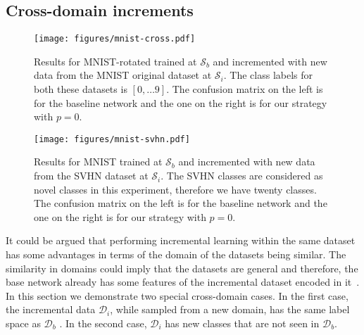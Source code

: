 \documentclass[10pt,twocolumn,letterpaper]{article}
\def \cS{{\mathcal{S}}}
\def \cD{{\mathcal{D}}}
\begin{document}
	
	\subsection{Cross-domain increments}
	
	\begin{figure}[t]
		\begin{center}
			\texttt{[image: figures/mnist-cross.pdf]}
		\end{center}
		
		\caption{Results for MNIST-rotated trained at $\cS_b$ and incremented with new data from the MNIST original dataset at $\cS_i$. The  class labels for both these datasets is $[0, \dots 9]$. The confusion matrix on the left is for the baseline network and the one on the right is for our strategy with $p=0$.}
		
		\label{fig:mnist-cross}
	\end{figure}
	
	\begin{figure}[t]
		\begin{center}
			\texttt{[image: figures/mnist-svhn.pdf]}
		\end{center}
		
		\caption{Results for MNIST trained at $\cS_b$ and incremented with new data from the SVHN dataset at $\cS_i$. The SVHN classes are considered as novel classes in this experiment, therefore we have twenty classes. The confusion matrix on the left is for the baseline network and the one on the right is for our strategy with $p=0$.}
		
		\label{fig:mnist-svhn}
	\end{figure}
	
	It could be argued that performing incremental learning within the same dataset has some advantages in terms of the domain of the datasets being similar.
	The similarity in domains could imply that the datasets are general and therefore, the base network already has some features of the incremental dataset encoded in it~\cite{venkatesan2016neural}.  
	In this section we demonstrate two special cross-domain cases.
	In the first case, the incremental data $\cD_i$, while sampled from a new domain, has the same label space as $\cD_b$ .
	In the second case, $\cD_i$ has new classes that are not seen in $\cD_b$.
	
\end{document}
